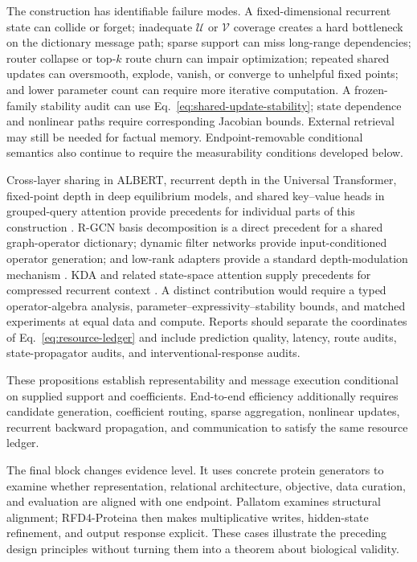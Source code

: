 \documentclass[10pt]{article}
\theoremstyle{definition}
\theoremstyle{remark}
\newcommand{\BookInsert}[1]{}
\begin{document}
The construction has identifiable failure modes.  A fixed-dimensional recurrent state can collide
or forget; inadequate $\mathcal U$ or $\mathcal V$ coverage creates a hard bottleneck on the
dictionary message path; sparse support can miss long-range dependencies; router collapse or
top-$k$ route churn can impair optimization; repeated shared updates can oversmooth, explode,
vanish, or converge to unhelpful fixed points; and lower parameter count can require more
iterative computation.  A frozen-family
stability audit can use Eq.~\ref{eq:shared-update-stability}; state dependence and nonlinear paths
require corresponding Jacobian bounds.  External retrieval may still be needed for factual memory.
Endpoint-removable conditional semantics also continue to require the measurability conditions
developed below.

Cross-layer sharing in ALBERT, recurrent depth in the Universal Transformer, fixed-point depth in
deep equilibrium models, and shared key--value heads in grouped-query attention provide precedents
for individual parts of this construction \cite{lan2020albert,dehghani2019universal,bai2019deq,ainslie2023gqa}.
R-GCN basis decomposition is a direct precedent for a shared graph-operator dictionary; dynamic
filter networks provide input-conditioned operator generation; and low-rank adapters provide a
standard depth-modulation mechanism \cite{schlichtkrull2018rgcn,jia2016dynamic,hu2022lora}.
KDA and related state-space attention supply precedents for compressed recurrent context
\cite{kimilinear2025,kimik3}.  A distinct contribution would require a typed operator-algebra
analysis, parameter--expressivity--stability bounds, and matched experiments at equal data and
compute.  Reports should separate the coordinates of Eq.~\ref{eq:resource-ledger} and include
prediction quality, latency, route audits, state-propagator audits, and interventional-response
audits.

These propositions establish representability and message execution conditional on supplied
support and coefficients.  End-to-end efficiency additionally requires candidate generation,
coefficient routing, sparse aggregation, nonlinear updates, recurrent backward propagation, and
communication to satisfy the same resource ledger.

\ifdefined\BOOKMODE
The final block changes evidence level.  It uses concrete protein generators to examine whether
representation, relational architecture, objective, data curation, and evaluation are aligned with
one endpoint.  Pallatom examines structural alignment; RFD4-Proteina then makes multiplicative
writes, hidden-state refinement, and output response explicit.  These cases illustrate the
preceding design principles without turning them into a theorem about biological validity.
\fi
\BookInsert{chapters/11_pallatom_structural_alignment}
\end{document}
